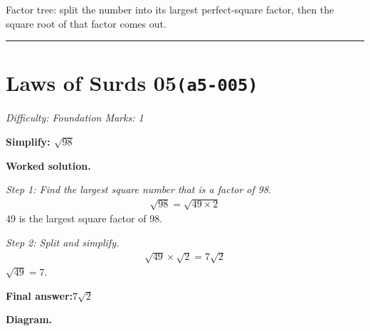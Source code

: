 \documentclass[11pt]{article}
\newcommand{\question}[1]{\par\medskip\noindent\textbf{#1}\par}
\begin{document}
\begin{center}
\end{center}
\small Factor tree: split the number into its largest perfect-square factor, then the square root of that factor comes out.\normalsize

\medskip\hrule

\section*{Laws of Surds 05\quad\small\texttt{(a5-005)}}
\textit{Difficulty: Foundation \quad\textbar\quad Marks: 1}

\question{Simplify: \( \sqrt{98} \)}

\textbf{Worked solution.}

\textit{Step 1: Find the largest square number that is a factor of 98.}
\[\begin{gathered}
\sqrt{98} = \sqrt{49 \times 2}
\end{gathered}\]
49 is the largest square factor of 98.

\textit{Step 2: Split and simplify.}
\[\begin{gathered}
\sqrt{49} \times \sqrt{2} = 7\sqrt{2}
\end{gathered}\]
\( \sqrt{49} = 7 \).

\begin{answerbox}
\textbf{Final answer:}\quad \(\displaystyle 7\sqrt{2}\)
\end{answerbox}
\textbf{Diagram.}
\end{document}
